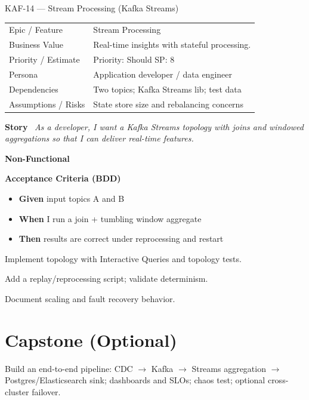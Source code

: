 \documentclass[11pt,a4paper]{article}
\newcommand{\Field}[2]{\textbf{#1}~#2}
\begin{document}
\begin{StoryCardBox}{KAF-14 --- Stream Processing (Kafka Streams)}
\begin{tabularx}{\linewidth}{LY}
 Epic / Feature & Stream Processing \\
 Business Value & Real-time insights with stateful processing. \\
 Priority / Estimate & Priority: Should \quad SP: 8 \\
 Persona & Application developer / data engineer \\
 Dependencies & Two topics; Kafka Streams lib; test data \\
 Assumptions / Risks & State store size and rebalancing concerns \\
\end{tabularx}

\medskip
\Field{Story}{\; \emph{As a developer, I want a Kafka Streams topology with joins and windowed aggregations so that I can deliver real-time features.}}

\medskip
\Field{Non-Functional}{\; \; }

\medskip
\Field{Acceptance Criteria (BDD)}{}
\begin{itemize}[leftmargin=1.2em, itemsep=1pt]
  \item \textbf{Given} input topics A and B
  \item \textbf{When} I run a join + tumbling window aggregate
  \item \textbf{Then} results are correct under reprocessing and restart
\end{itemize}

\begin{TasksBox}
\begin{tasklist}
  \item Implement topology with Interactive Queries and topology tests.
  \item Add a replay/reprocessing script; validate determinism.
  \item Document scaling and fault recovery behavior.
\end{tasklist}
\end{TasksBox}
\end{StoryCardBox}

\section*{Capstone (Optional)}
Build an end-to-end pipeline: CDC $\rightarrow$ Kafka $\rightarrow$ Streams aggregation $\rightarrow$ Postgres/Elasticsearch sink; dashboards and SLOs; chaos test; optional cross-cluster failover.
\end{document}
